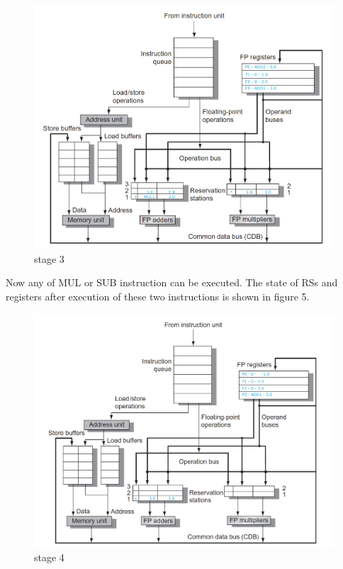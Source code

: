 \documentclass[12pt]{article}
\begin{document}
\begin{figure}[H]
	\centering
	\includegraphics[width=1\textwidth]{./images/tomas/e3.png}	
	\cprotect\caption{stage 3}
\end{figure}


Now any of MUL or SUB instruction can be executed. The state of RSs and registers after execution of these two instructions is shown in figure 5. 

\begin{figure}[H]
	\centering
	\includegraphics[width=1\textwidth]{./images/tomas/e4.png}	
	\cprotect\caption{stage 4}
\end{figure}
\end{document}
